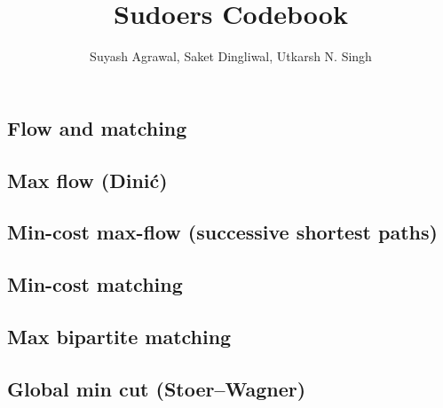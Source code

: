 \documentclass[12pt]{extarticle}
\title{Sudoers Codebook}
\author{Suyash Agrawal, Saket Dingliwal, Utkarsh N. Singh}
\date{}
\begin{document}
\maketitle
\begin{multicols*}{2}
\setlength{\parskip}{0.0in}
\tableofcontents
\setlength{\parskip}{0.1in}
\section{Flow and matching}

\subsection{Max flow (Dini\'c)} %


\subsection{Min-cost max-flow (successive shortest paths)}


\subsection{Min-cost matching} %


\subsection{Max bipartite matching} %


\subsection{Global min cut (Stoer--Wagner)} %



\end{multicols*}
\end{document}
